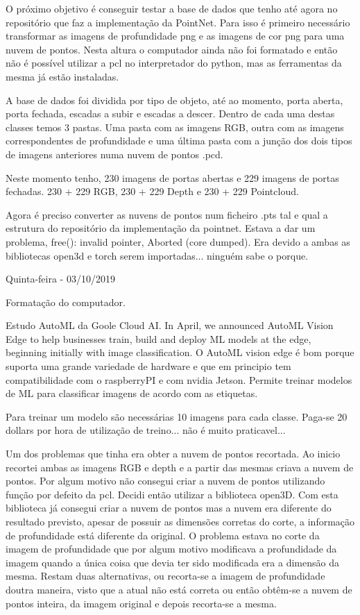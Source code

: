         O próximo objetivo é conseguir testar a base de dados que tenho até agora no repositório que faz a implementação da PointNet. Para isso é primeiro necessário transformar as imagens de profundidade png e as imagens de cor png para uma nuvem de pontos. Nesta altura o computador ainda não foi formatado e então não é possível utilizar a pcl no interpretador do python, mas as ferramentas da mesma já estão instaladas.
        
        A base de dados foi dividida por tipo de objeto, até ao momento, porta aberta, porta fechada, escadas a subir e escadas a descer. Dentro de cada uma destas classes temos 3 pastas. Uma pasta com as imagens RGB, outra com as imagens correspondentes de profundidade e uma última pasta com a junção dos dois tipos de imagens anteriores numa nuvem de pontos .pcd.
        
        Neste momento tenho, 230 imagens de portas abertas e 229 imagens de portas fechadas. 230 + 229 RGB, 230 + 229 Depth e 230 + 229 Pointcloud.
        
        Agora é preciso converter as nuvens de pontos num ficheiro .pts tal e qual a estrutura do repositório da implementação da pointnet. Estava a dar um problema, free(): invalid pointer, Aborted (core dumped). Era devido a ambas as bibliotecas open3d e torch serem importadas... ninguém sabe o porque.
        
        \bigskip
        
        Quinta-feira - 03/10/2019
        
        Formatação do computador.
        
        Estudo AutoML da Goole Cloud AI.
        In April, we announced AutoML Vision Edge to help businesses train, build and deploy ML models at the edge, beginning initially with image classification.
        O AutoML vision edge é bom porque suporta uma grande variedade de hardware e que em principio tem compatibilidade com o raspberryPI e com nvidia Jetson. Permite treinar modelos de ML para classificar imagens de acordo com as etiquetas.
        
        Para treinar um modelo são necessárias 10 imagens para cada classe.
        Paga-se 20 dollars por hora de utilização de treino... não é muito praticavel...
        
        Um dos problemas que tinha era obter a nuvem de pontos recortada. Ao inicio recortei ambas as imagens RGB e depth e a partir das mesmas criava a nuvem de pontos. Por algum motivo não consegui criar a nuvem de pontos utilizando  função por defeito da pcl. Decidi então utilizar a biblioteca open3D. Com esta biblioteca já consegui criar a nuvem de pontos mas a nuvem era diferente do resultado previsto, apesar de possuir as dimensões corretas do corte, a informação de profundidade está diferente da original. O problema estava no corte da imagem de profundidade que por algum motivo modificava a profundidade da imagem quando a única coisa que devia ter sido modificada era a dimensão da mesma. Restam duas alternativas, ou recorta-se a imagem de profundidade doutra maneira, visto que a atual não está correta ou então obtêm-se a nuvem de pontos inteira, da imagem original e depois recorta-se a mesma.
        

